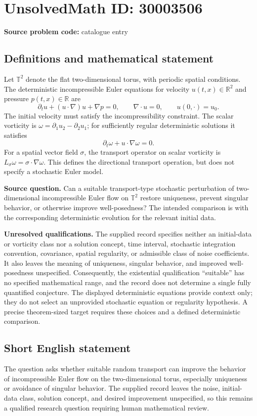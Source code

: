 \documentclass[11pt]{article}
\newcommand{\R}{\mathbb{R}}
\begin{document}
\section*{UnsolvedMath ID: 30003506}
\textbf{Source problem code:} catalogue entry
\subsection{Definitions and mathematical statement}
Let \(\mathbb T^2\) denote the flat two-dimensional torus, with periodic spatial conditions. The deterministic incompressible Euler equations for velocity \(u(t,x)\in\R^2\) and pressure \(p(t,x)\in\R\) are
\[
\partial_t u+(u\cdot\nabla)u+\nabla p=0,
\qquad \nabla\cdot u=0,
\qquad u(0,\cdot)=u_0.
\]
The initial velocity must satisfy the incompressibility constraint. The scalar vorticity is \(\omega=\partial_1u_2-\partial_2u_1\); for sufficiently regular deterministic solutions it satisfies
\[
\partial_t\omega+u\cdot\nabla\omega=0.
\]
For a spatial vector field \(\sigma\), the transport operator on scalar vorticity is \(L_\sigma\omega=\sigma\cdot\nabla\omega\). This defines the directional transport operation, but does not specify a stochastic Euler model.

\textbf{Source question.} Can a suitable transport-type stochastic perturbation of two-dimensional incompressible Euler flow on \(\mathbb T^2\) restore uniqueness, prevent singular behavior, or otherwise improve well-posedness? The intended comparison is with the corresponding deterministic evolution for the relevant initial data.

\textbf{Unresolved qualifications.} The supplied record specifies neither an initial-data or vorticity class nor a solution concept, time interval, stochastic integration convention, covariance, spatial regularity, or admissible class of noise coefficients. It also leaves the meaning of uniqueness, singular behavior, and improved well-posedness unspecified. Consequently, the existential qualification ``suitable'' has no specified mathematical range, and the record does not determine a single fully quantified conjecture. The displayed deterministic equations provide context only; they do not select an unprovided stochastic equation or regularity hypothesis. A precise theorem-sized target requires these choices and a defined deterministic comparison.
\subsection{Short English statement}
The question asks whether suitable random transport can improve the behavior of incompressible Euler flow on the two-dimensional torus, especially uniqueness or avoidance of singular behavior. The supplied record leaves the noise, initial-data class, solution concept, and desired improvement unspecified, so this remains a qualified research question requiring human mathematical review.
\end{document}
